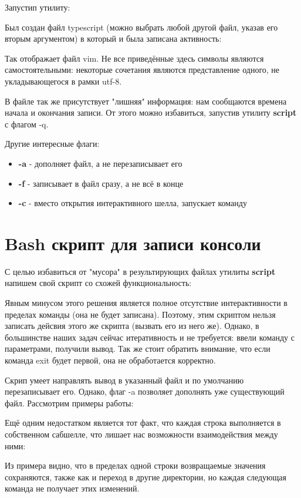 \documentclass[a4paper]{article}
\begin{document}
Запустип утилиту:

Был создан файл typescript (можно выбрать любой другой файл, указав его вторым аргументом) в который и была записана активность:

Так отображает файл vim. Не все приведённые здесь символы являются самостоятельными: некоторые сочетания являются представление одного, не укладывающегося в рамки utf-8.

В файле так же присутствует "лишняя" информация: нам сообщаются времена начала и окончания записи. От этого можно избавиться, запустив утилиту \textbf{script} с флагом -q.

Другие интересные флаги:
\begin{itemize}
\item \textbf{-a} - дополняет файл, а не перезаписывает его
\item \textbf{-f} - записывает в файл сразу, а не всё в конце
\item \textbf{-c} - вместо открытия интерактивного шелла, запускает команду
\end{itemize}

\section{ Bash скрипт для записи консоли}
С целью избавиться от "мусора" в результирующих файлах утилиты \textbf{script} напишем свой скрипт со схожей функциональность:


Явным минусом этого решения является полное отсутствие интерактивности в пределах команды (она не будет записана). Поэтому, этим скриптом нельзя записать дейсвия этого же скрипта (вызвать его из него же). Однако, в большинстве наших задач сейчас итеративность и не требуется: ввели команду с параметрами, получили вывод. Так же стоит обратить внимание, что если команда exit будет первой, она не обработается корректно.

Скрип умеет направлять вывод в указанный файл и по умолчанию перезаписывает его. Однако, флаг -a позволяет дополнять уже существующий файл. Рассмотрим примеры работы:


Ещё одним недостатком является тот факт, что каждая строка выполняется в собственном сабшелле, что лишает нас возможности взаимодействия между ними:

Из примера видно, что в пределах одной строки возвращаемые значения сохраняются, также как и переход в другие директории, но каждая следующая команда не получает этих изменений.
\end{document}
